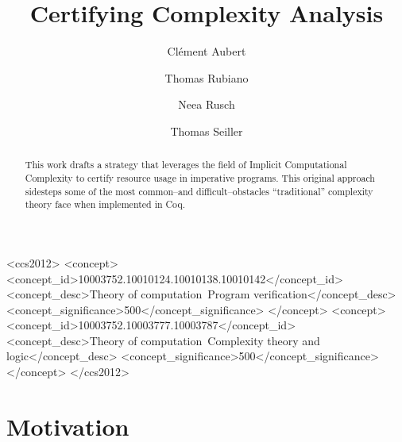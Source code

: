 \documentclass[sigplan,screen,timestamp,%
nonacm]{acmart}
\begin{document}
\author{Clément Aubert}

\author{Thomas Rubiano}

\author{Neea Rusch}

\author{Thomas Seiller}

\title{Certifying Complexity Analysis}

\begin{abstract}
This work drafts a strategy that leverages the field of Implicit Computational Complexity to certify resource usage in imperative programs.
This original approach sidesteps some of the most common--and difficult--obstacles \enquote{traditional} complexity theory face when implemented in Coq.
\end{abstract}


\begin{CCSXML}
<ccs2012>
   <concept>
       <concept_id>10003752.10010124.10010138.10010142</concept_id>
       <concept_desc>Theory of computation~Program verification</concept_desc>
       <concept_significance>500</concept_significance>
       </concept>
   <concept>
       <concept_id>10003752.10003777.10003787</concept_id>
       <concept_desc>Theory of computation~Complexity theory and logic</concept_desc>
       <concept_significance>500</concept_significance>
       </concept>
 </ccs2012>
\end{CCSXML}


\maketitle

\section{Motivation}
\label{sec:motivation}
\end{document}
